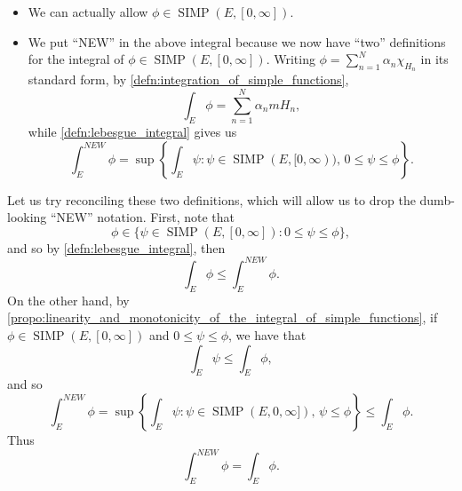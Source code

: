\documentclass[notoc,notitlepage]{tufte-book}
\DeclareMathOperator{\SIMP}{SIMP}
\begin{document}
\begin{note}
  \begin{itemize}
    \item We can actually allow $\phi \in \SIMP(E, [0, \infty])$.
    \item We put ``NEW'' in the above integral because we now have ``two''
      definitions for the integral of $\phi \in \SIMP(E, [0, \infty])$. Writing
      $\phi = \sum_{n=1}^{N} \alpha_n \chi_{H_n}$ in its standard form, by
      \cref{defn:integration_of_simple_functions},
      \begin{equation*}
        \int_{E} \phi = \sum_{n=1}^{N} \alpha_n mH_n,
      \end{equation*}
      while \cref{defn:lebesgue_integral} gives us
      \begin{equation*}
        \int_{E}^{NEW} \phi = \sup \left\{ \int_{E} \psi : \psi \in \SIMP(E, [0,
        \infty)),\, 0 \leq \psi \leq \phi \right\}.
      \end{equation*}
  \end{itemize}
\end{note}

\begin{remark}
  Let us try reconciling these two definitions, which will allow us to drop the
  dumb-looking ``NEW'' notation. First, note that
  \begin{equation*}
    \phi \in \{ \psi \in  \SIMP(E, [0, \infty]) : 0 \leq \psi \leq \phi \},
  \end{equation*}
  and so by \cref{defn:lebesgue_integral}, then
  \begin{equation*}
    \int_{E} \phi \leq \int_{E}^{NEW} \phi.
  \end{equation*}
  On the other hand, by
  \cref{propo:linearity_and_monotonicity_of_the_integral_of_simple_functions},
  if $\phi \in \SIMP(E, [0, \infty])$ and $0 \leq \psi \leq \phi$, we have that
  \begin{equation*}
    \int_{E} \psi \leq \int_{E} \phi,
  \end{equation*}
  and so
  \begin{equation*}
    \int_{E}^{NEW} \phi = \sup \left\{ \int_{E} \psi : \psi \in \SIMP(E, 0,
    \infty]),\, \psi \leq \phi \right\} \leq \int_{E} \phi.
  \end{equation*}
  Thus
  \begin{equation*}
    \int_{E}^{NEW} \phi = \int_{E} \phi.
  \end{equation*}
\end{remark}
\end{document}
